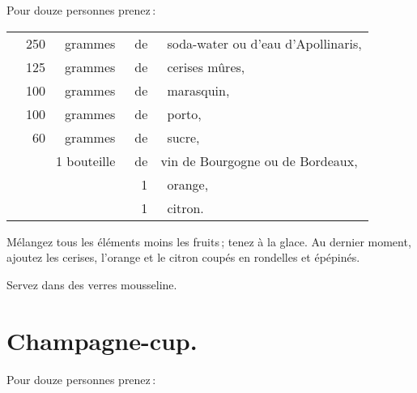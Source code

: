 Pour douze personnes prenez :

\footnotesize
\begin{longtable}{rrrrp{16em}}
  & 250 & grammes & de & soda-water ou d'eau d'Apollinaris,                                               \\
  & 125 & grammes & de & cerises mûres,                                                                   \\
  & 100 & grammes & de & marasquin,                                                                       \\
  & 100 & grammes & de & porto,                                                                           \\
  &  60 & grammes & de & sucre,                                                                           \\
  & \multicolumn{2}{r}{1 bouteille} & de & vin de Bourgogne ou de Bordeaux,                               \\
  &     &         &  1 & orange,                                                                          \\
  &     &         &  1 & citron.                                                                          \\
\end{longtable}
\normalsize

Mélangez tous les éléments moins les fruits ; tenez à la glace. Au dernier
moment, ajoutez les cerises, l'orange et le citron coupés en rondelles et
épépinés.

Servez dans des verres mousseline.

\section*{\centering Champagne-cup.}
{}

Pour douze personnes prenez :

